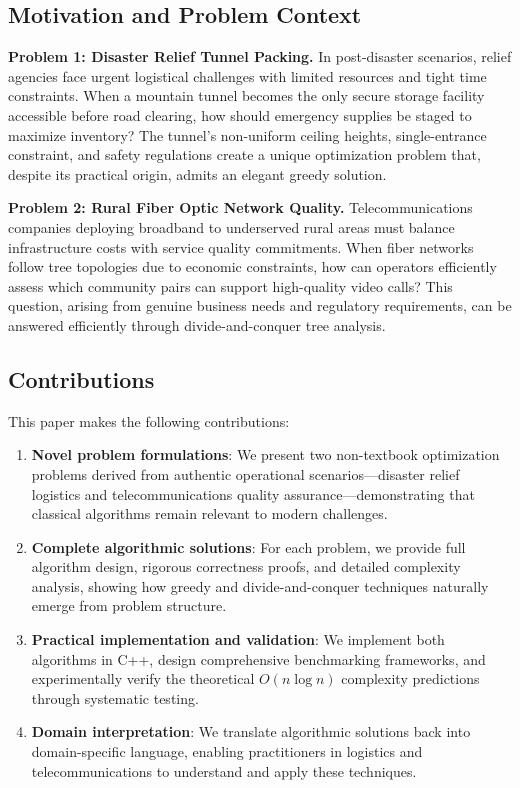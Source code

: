 \documentclass[sigconf]{acmart}
\begin{document}
\subsection{Motivation and Problem Context}

\textbf{Problem 1: Disaster Relief Tunnel Packing.}
In post-disaster scenarios, relief agencies face urgent logistical challenges with limited resources and tight time constraints. When a mountain tunnel becomes the only secure storage facility accessible before road clearing, how should emergency supplies be staged to maximize inventory? The tunnel's non-uniform ceiling heights, single-entrance constraint, and safety regulations create a unique optimization problem that, despite its practical origin, admits an elegant greedy solution.

\textbf{Problem 2: Rural Fiber Optic Network Quality.}
Telecommunications companies deploying broadband to underserved rural areas must balance infrastructure costs with service quality commitments. When fiber networks follow tree topologies due to economic constraints, how can operators efficiently assess which community pairs can support high-quality video calls? This question, arising from genuine business needs and regulatory requirements, can be answered efficiently through divide-and-conquer tree analysis.

\subsection{Contributions}

This paper makes the following contributions:

\begin{enumerate}[leftmargin=*, itemsep=0.3em]
\item \textbf{Novel problem formulations}: We present two non-textbook optimization problems derived from authentic operational scenarios—disaster relief logistics and telecommunications quality assurance—demonstrating that classical algorithms remain relevant to modern challenges.

\item \textbf{Complete algorithmic solutions}: For each problem, we provide full algorithm design, rigorous correctness proofs, and detailed complexity analysis, showing how greedy and divide-and-conquer techniques naturally emerge from problem structure.

\item \textbf{Practical implementation and validation}: We implement both algorithms in C++, design comprehensive benchmarking frameworks, and experimentally verify the theoretical $O(n \log n)$ complexity predictions through systematic testing.

\item \textbf{Domain interpretation}: We translate algorithmic solutions back into domain-specific language, enabling practitioners in logistics and telecommunications to understand and apply these techniques.
\end{enumerate}
\end{document}
